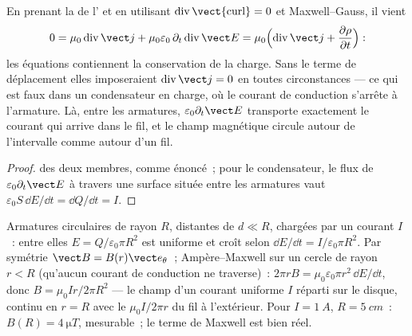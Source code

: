 \begin{proposition}\label{prop:b2:maxwell-equations:displacement}
En prenant la  de l' et en utilisant
$\operatorname{div}\operatorname{\vect{curl}} = 0$ et Maxwell--Gauss, il vient
\[
0 = \mu_0\operatorname{div}\vect j + \mu_0\varepsilon_0\,\partial_t\operatorname{div}\vect E
= \mu_0\Bigl(\operatorname{div}\vect j + \frac{\partial\rho}{\partial t}\Bigr) :
\]
les équations contiennent la conservation de la charge. Sans le terme de
déplacement elles imposeraient $\operatorname{div}\vect j = 0$ en toutes circonstances
--- ce qui est faux dans un condensateur en charge, où le courant de conduction s'arrête
à l'armature. Là, entre les armatures, $\varepsilon_0\partial_t\vect E$ transporte
exactement le courant qui arrive dans le fil, et le champ magnétique
circule autour de l'intervalle comme autour d'un fil.
\end{proposition}

\begin{proof}
 des deux membres, comme énoncé~; pour le condensateur, le flux de
$\varepsilon_0\partial_t\vect E$ à travers une surface située entre les armatures vaut
$\varepsilon_0S\,\dd E/\dd t = \dd Q/\dd t = I$.
\end{proof}

\begin{example}\label{ex:b2:maxwell-equations:capacitor}
Armatures circulaires de rayon $R$, distantes de $d \ll R$, chargées par un courant
$I$~: entre elles $E = Q/\varepsilon_0\pi R^2$ est uniforme et croît selon $\dd E/
\dd t = I/\varepsilon_0\pi R^2$. Par symétrie $\vect B = B(r)\vect e_\theta$~; Ampère--Maxwell
sur un cercle de rayon $r < R$ (qu'aucun courant de conduction ne traverse)~: $2\pi rB
= \mu_0\varepsilon_0\pi r^2\,\dd E/\dd t$, donc $B = \mu_0Ir/2\pi R^2$ --- le champ d'un
courant uniforme $I$ réparti sur le disque, continu en $r = R$ avec le
$\mu_0I/2\pi r$ du fil à l'extérieur. Pour $I = \qty{1}{A}$, $R = \qty{5}{cm}$~: $B(R) =
\qty{4}{\micro T}$, mesurable~; le terme de Maxwell est bien réel.
\end{example}

